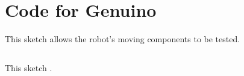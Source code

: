 \chapter{Code for Genuino}\label{code}\label{section \thechapter}

% 

\label{ino:test_routine}
This \gls{sketch} allows the robot's moving components to be tested.
\inputminted{cpp}{Code/test_routine.ino}

\label{ino:gps_navigation}
This \gls{sketch} .
\inputminted{cpp}{Code/gps_navigation.ino}
